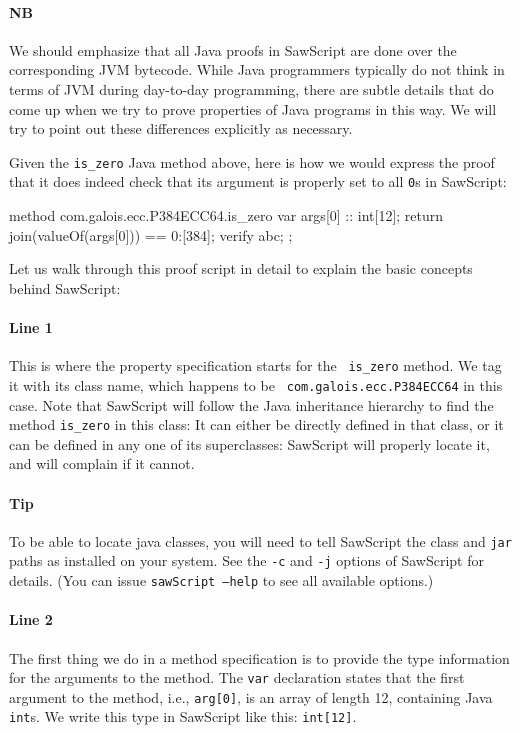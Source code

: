 \documentclass[12pt]{galois-whitepaper}
\newcommand{\sawScript}{{\sc SawScript}\xspace}
\begin{document}
\paragraph{NB} We should emphasize that all Java proofs in \sawScript are done over the corresponding JVM bytecode. While Java programmers
typically do not think in terms of JVM during day-to-day programming, there are subtle details that do come up when
we try to prove properties of Java programs in this way. We will try to point out these differences explicitly as necessary.

Given the {\tt is\_zero} Java method above, here is how we would express the proof that it does indeed check that
its argument is properly set to all {\tt 0}s in \sawScript:

\begin{code}[numbers=left]
  method com.galois.ecc.P384ECC64.is_zero {
    var args[0] :: int[12];
    return join(valueOf(args[0])) == 0:[384];
    verify abc;
  };
\end{code}
Let us walk through this proof script in detail to explain the basic concepts behind \sawScript:

\paragraph{Line 1} This is where the property specification starts for the {\tt
is\_zero} method. We tag it with its class name, which happens to be {\tt
com.galois.ecc.P384ECC64} in this case. Note that \sawScript will follow the
Java inheritance hierarchy to find the method {\tt is\_zero} in this class: It
can either be directly defined in that class, or it can be defined in any one
of its superclasses: \sawScript will properly locate it, and will complain if
it cannot.

\paragraph{Tip} To be able to locate java classes, you will need to tell \sawScript the class and {\tt jar} paths as installed
on your system. See the {\tt -c} and {\tt -j} options of \sawScript for details. (You can issue {\tt sawScript --help} to see
all available options.)

\paragraph{Line 2} The first thing we do in a method specification is to provide the type information for the arguments to the method.
The {\tt var} declaration states that the first argument to the method, i.e., {\tt arg[0]}, is an array of length 12, containing
Java {\tt int}s. We write this type in \sawScript like this: {\tt int[12]}.
\end{document}
